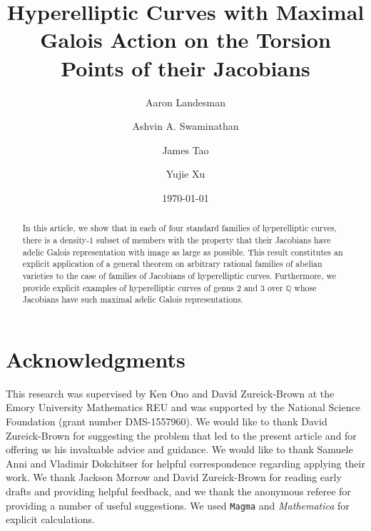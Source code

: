 \documentclass[12 pt]{amsart}
\title[Hyperelliptic Curves with Maximal Galois Action on Torsion of Jacobian]{Hyperelliptic Curves with Maximal Galois Action on the Torsion Points of their Jacobians}
\date{\today}
\author[Aaron Landesman]{Aaron Landesman}
\author[Ashvin A. Swaminathan]{Ashvin A. Swaminathan}
\author[James Tao]{James Tao}
\author[Yujie Xu]{Yujie Xu}
\theoremstyle{plain}
\theoremstyle{definition}
\theoremstyle{remark}
\numberwithin{equation}{section}
\begin{document}
\begin{abstract}
In this article, we show that in each of four standard families of hyperelliptic curves, there is a density-$1$ subset of members with the property that their Jacobians have adelic Galois representation with image as large as possible. This result constitutes an explicit application of a general theorem on arbitrary rational families of abelian varieties to the case of families of Jacobians of hyperelliptic curves.
Furthermore, we provide explicit examples
of hyperelliptic curves of genus $2$ and $3$ over $\mathbb Q$
whose Jacobians have such maximal adelic Galois representations.
\end{abstract} 

\maketitle





 

	
\section*{Acknowledgments}

\noindent This research was supervised by Ken Ono and David Zureick-Brown at the Emory University Mathematics REU and was supported by the National Science Foundation (grant number DMS-1557960). We would like to thank David Zureick-Brown for suggesting the problem that led to the present article and for offering us his invaluable advice and guidance.  We would like to thank
Samuele Anni
and
Vladimir Dokchitser
for helpful correspondence regarding applying their work.
We thank Jackson Morrow and David Zureick-Brown for reading early drafts and providing helpful feedback, and we thank the anonymous referee for providing a number of useful suggestions. We used {\tt Magma} and \emph{Mathematica} for explicit calculations.



\end{document}
